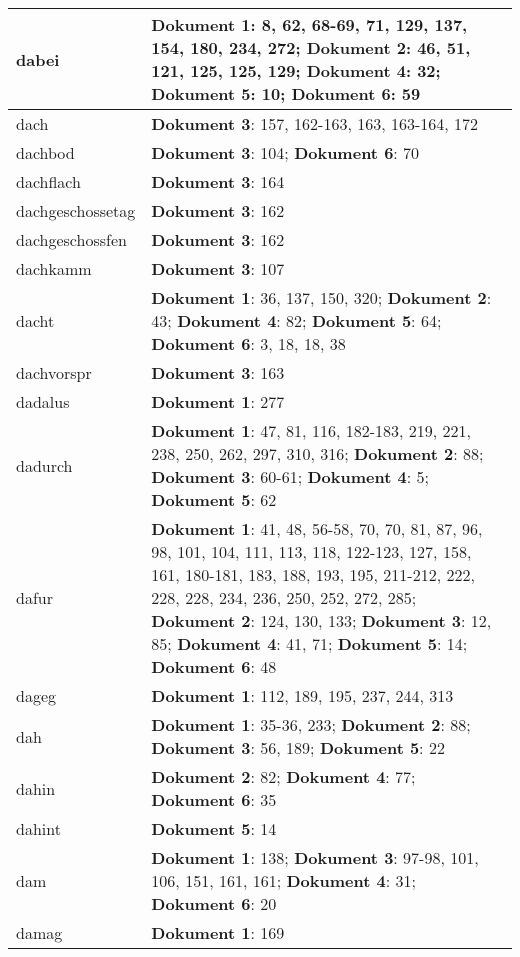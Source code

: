 \documentclass[a5paper]{article}
\begin{document}
\begin{longtable}[l]{|l|p{3in}|}
\hline
dabei & \textbf{Dokument 1}: 8, 62, 68-69, 71, 129, 137, 154, 180, 234, 272; \textbf{Dokument 2}: 46, 51, 121, 125, 125, 129; \textbf{Dokument 4}: 32; \textbf{Dokument 5}: 10; \textbf{Dokument 6}: 59 \\
\hline
dach & \textbf{Dokument 3}: 157, 162-163, 163, 163-164, 172 \\
\hline
dachbod & \textbf{Dokument 3}: 104; \textbf{Dokument 6}: 70 \\
\hline
dachflach & \textbf{Dokument 3}: 164 \\
\hline
dachgeschossetag & \textbf{Dokument 3}: 162 \\
\hline
dachgeschossfen & \textbf{Dokument 3}: 162 \\
\hline
dachkamm & \textbf{Dokument 3}: 107 \\
\hline
dacht & \textbf{Dokument 1}: 36, 137, 150, 320; \textbf{Dokument 2}: 43; \textbf{Dokument 4}: 82; \textbf{Dokument 5}: 64; \textbf{Dokument 6}: 3, 18, 18, 38 \\
\hline
dachvorspr & \textbf{Dokument 3}: 163 \\
\hline
dadalus & \textbf{Dokument 1}: 277 \\
\hline
dadurch & \textbf{Dokument 1}: 47, 81, 116, 182-183, 219, 221, 238, 250, 262, 297, 310, 316; \textbf{Dokument 2}: 88; \textbf{Dokument 3}: 60-61; \textbf{Dokument 4}: 5; \textbf{Dokument 5}: 62 \\
\hline
dafur & \textbf{Dokument 1}: 41, 48, 56-58, 70, 70, 81, 87, 96, 98, 101, 104, 111, 113, 118, 122-123, 127, 158, 161, 180-181, 183, 188, 193, 195, 211-212, 222, 228, 228, 234, 236, 250, 252, 272, 285; \textbf{Dokument 2}: 124, 130, 133; \textbf{Dokument 3}: 12, 85; \textbf{Dokument 4}: 41, 71; \textbf{Dokument 5}: 14; \textbf{Dokument 6}: 48 \\
\hline
dageg & \textbf{Dokument 1}: 112, 189, 195, 237, 244, 313 \\
\hline
dah & \textbf{Dokument 1}: 35-36, 233; \textbf{Dokument 2}: 88; \textbf{Dokument 3}: 56, 189; \textbf{Dokument 5}: 22 \\
\hline
dahin & \textbf{Dokument 2}: 82; \textbf{Dokument 4}: 77; \textbf{Dokument 6}: 35 \\
\hline
dahint & \textbf{Dokument 5}: 14 \\
\hline
dam & \textbf{Dokument 1}: 138; \textbf{Dokument 3}: 97-98, 101, 106, 151, 161, 161; \textbf{Dokument 4}: 31; \textbf{Dokument 6}: 20 \\
\hline
damag & \textbf{Dokument 1}: 169 \\

\end{longtable}
\end{document}
